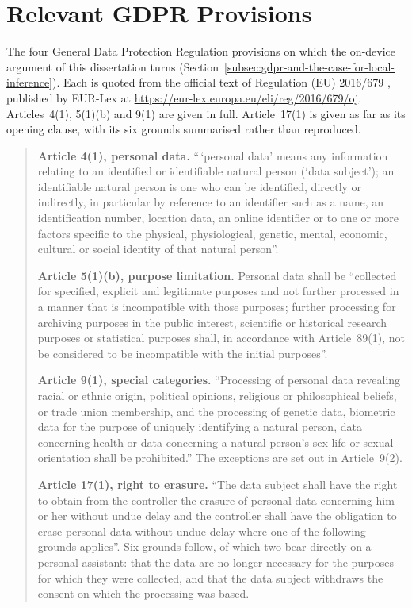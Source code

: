 \section*{Relevant GDPR Provisions}

The four General Data Protection Regulation provisions on which the on-device argument of this dissertation turns (Section~\ref{subsec:gdpr-and-the-case-for-local-inference}). Each is quoted from the official text of Regulation (EU) 2016/679 \cite{gdpr2016}, published by EUR-Lex at \url{https://eur-lex.europa.eu/eli/reg/2016/679/oj}. Articles~4(1), 5(1)(b) and 9(1) are given in full. Article~17(1) is given as far as its opening clause, with its six grounds summarised rather than reproduced.

\begin{quote}
  \textbf{Article 4(1), personal data.} ``\,`personal data' means any information relating to an identified or identifiable natural person (`data subject'); an identifiable natural person is one who can be identified, directly or indirectly, in particular by reference to an identifier such as a name, an identification number, location data, an online identifier or to one or more factors specific to the physical, physiological, genetic, mental, economic, cultural or social identity of that natural person''.

  \textbf{Article 5(1)(b), purpose limitation.} Personal data shall be ``collected for specified, explicit and legitimate purposes and not further processed in a manner that is incompatible with those purposes; further processing for archiving purposes in the public interest, scientific or historical research purposes or statistical purposes shall, in accordance with Article~89(1), not be considered to be incompatible with the initial purposes''.

  \textbf{Article 9(1), special categories.} ``Processing of personal data revealing racial or ethnic origin, political opinions, religious or philosophical beliefs, or trade union membership, and the processing of genetic data, biometric data for the purpose of uniquely identifying a natural person, data concerning health or data concerning a natural person's sex life or sexual orientation shall be prohibited.'' The exceptions are set out in Article~9(2).

  \textbf{Article 17(1), right to erasure.} ``The data subject shall have the right to obtain from the controller the erasure of personal data concerning him or her without undue delay and the controller shall have the obligation to erase personal data without undue delay where one of the following grounds applies''. Six grounds follow, of which two bear directly on a personal assistant: that the data are no longer necessary for the purposes for which they were collected, and that the data subject withdraws the consent on which the processing was based.
\end{quote}

